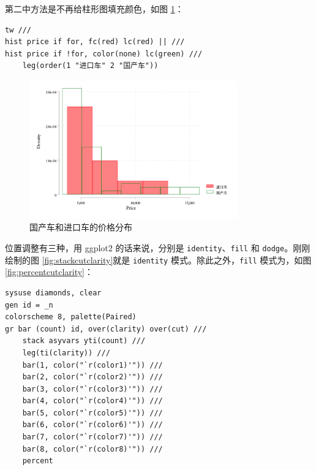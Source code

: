 \documentclass[]{ctexbook}
\begin{document}
第二中方法是不再给柱形图填充颜色，如图 \ref{fig:histautoprice3}：

\begin{lstlisting}
tw ///
hist price if for, fc(red) lc(red) || ///
hist price if !for, color(none) lc(green) ///
    leg(order(1 "进口车" 2 "国产车"))
\end{lstlisting}

\begin{figure}

{\centering \includegraphics[width=0.8\textwidth]{assets/histautoprice3} 

}

\caption{国产车和进口车的价格分布}\label{fig:histautoprice3}
\end{figure}

位置调整有三种，用 ggplot2 的话来说，分别是 \texttt{identity}、\texttt{fill} 和 \texttt{dodge}。刚刚绘制的图 \ref{fig:stackcutclarity}就是 \texttt{identity} 模式。除此之外，\texttt{fill} 模式为，如图 \ref{fig:percentcutclarity}：

\begin{lstlisting}
sysuse diamonds, clear
gen id = _n
colorscheme 8, palette(Paired)
gr bar (count) id, over(clarity) over(cut) ///
    stack asyvars yti(count) ///
    leg(ti(clarity)) ///
    bar(1, color("`r(color1)'")) ///
    bar(2, color("`r(color2)'")) ///
    bar(3, color("`r(color3)'")) ///
    bar(4, color("`r(color4)'")) ///
    bar(5, color("`r(color5)'")) ///
    bar(6, color("`r(color6)'")) ///
    bar(7, color("`r(color7)'")) ///
    bar(8, color("`r(color8)'")) ///
    percent
\end{lstlisting}
\end{document}
